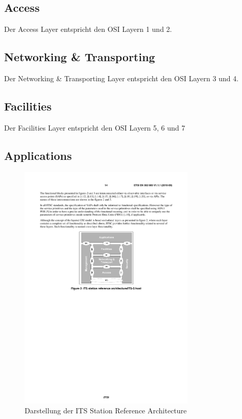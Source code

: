 \subsection{Access}
Der Access Layer entspricht den \ac{OSI} Layern 1 und 2. 

\subsection{Networking \& Transporting}
Der Networking \& Transporting Layer entspricht den \ac{OSI} Layern 3 und 4.

\subsection{Facilities}
Der Facilities Layer entspricht den \ac{OSI} Layern 5, 6 und 7

\subsection{Applications}


\begin{figure}
\includegraphics[width=0.75\textwidth]{content/images/01_funktionsweise/stationReferenceArchitecture.pdf}
\caption{Darstellung der ITS Station Reference Architecture \cite{etsi2010302}}
\label{fig:funktionsweise_referenceArchitecture}
\end{figure}

